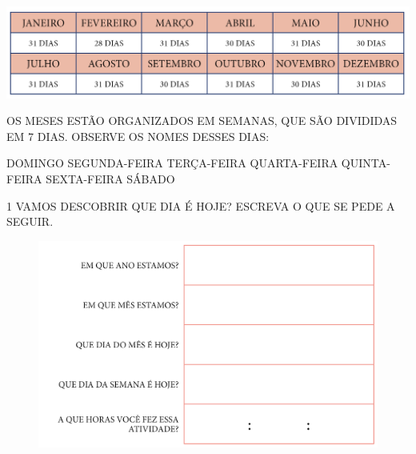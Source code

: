 {\includegraphics[width=\textwidth]{../ilustracoes/MAT1/SAEB_1ANO_MAT_FIGURA46.png}

OS MESES ESTÃO ORGANIZADOS EM SEMANAS, QUE SÃO DIVIDIDAS EM 7 DIAS. OBSERVE OS NOMES
DESSES DIAS:

\begin{mdframed}[linewidth=2pt,linecolor=salmao,roundcorner=10pt]
DOMINGO \hfill SEGUNDA-FEIRA \hfill TERÇA-FEIRA \hfill QUARTA-FEIRA \hfill QUINTA-FEIRA \hfill SEXTA-FEIRA \hfill
SÁBADO
\end{mdframed}
}

\pagebreak
{}

\num{1} VAMOS DESCOBRIR QUE DIA É HOJE? ESCREVA O QUE SE PEDE A SEGUIR.

%
%
%
%

\begin{figure}[htpb!]
\centering
\includegraphics[width=\textwidth]{../ilustracoes/MAT1/SAEB_1ANO_MAT_FIGURA48.png}
\end{figure}


